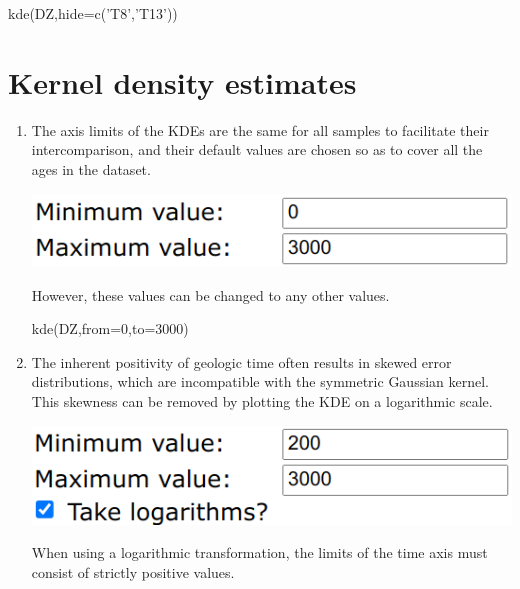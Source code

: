 \begin{refsection}
\begin{console}
kde(DZ,hide=c('T8','T13'))
\end{console}

\section{Kernel density estimates}

\begin{enumerate}
  
\item The axis limits of the KDEs are the same for all samples to
  facilitate their intercomparison, and their default values are
  chosen so as to cover all the ages in the dataset.

  \noindent\begin{minipage}[t]{.4\linewidth}
\strut\vspace*{-\baselineskip}\newline
\includegraphics[width=\linewidth]{../figures/detritalKDElimits.png}
\end{minipage}
\begin{minipage}[t]{.6\linewidth}
However, these values can be changed to any other values.
\end{minipage}

\begin{console}
kde(DZ,from=0,to=3000)
\end{console}

\item The inherent positivity of geologic time often results in skewed
  error distributions, which are incompatible with the symmetric
  Gaussian kernel. This skewness can be removed by plotting the KDE on
  a logarithmic scale.

  \noindent\begin{minipage}[t]{.4\linewidth}
\strut\vspace*{-\baselineskip}\newline
\includegraphics[width=\linewidth]{../figures/detritalKDElogscale.png}
\end{minipage}
\begin{minipage}[t]{.6\linewidth}
  When using a logarithmic transformation, the limits of the time axis
  must consist of strictly positive values.
\end{minipage}


\end{enumerate}
\end{refsection}

